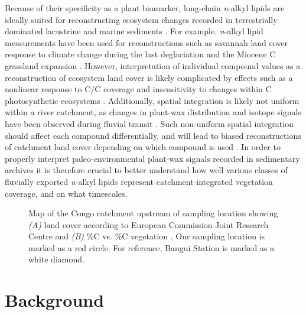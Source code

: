 Because of their specificity as a plant biomarker, long-chain \textit{n}-alkyl lipids are ideally suited for reconstructing ecosystem changes recorded in terrestrially dominated lacustrine and marine sediments \citep{Pancost:2004ij,Eglinton:2008hs,Castaneda:2011jb,Freeman:2014gi}. For example, \textit{n}-alkyl lipid  measurements have been used for reconstructions such as savannah land cover response to climate change during the last deglaciation \citep{Hughen:2004gc} and the Miocene C grassland expansion \citep{Freeman:2001tv,Hoetzel:2013hj}. However, interpretation of individual compound  values as a reconstruction of ecosystem land cover is likely complicated by effects such as a nonlinear response to C/C coverage \citep{Garcin:2014hg} and insensitivity to changes within C photosynthetic ecosystems \citep[\textit{i.e.} woody vs. non-woody][]{Feakins:2013ks,Magill:2013ab,Magill:2013cz}. Additionally, spatial integration is likely not uniform within a river catchment, as changes in plant-wax distribution and isotope signals have been observed during fluvial transit \citep{Galy:2011hk,Galy:2011ix,Ponton:2014jr}. Such non-uniform spatial integration should affect each compound differentially, and will lead to biased reconstructions of catchment land cover depending on which compound is used \citep[\textit{e.g.}][]{Wang:2013jz}. In order to properly interpret paleo-environmental plant-wax signals recorded in sedimentary archives it is therefore crucial to better understand how well various classes of fluvially exported \textit{n}-alkyl lipids represent catchment-integrated vegetation coverage, and on what timescales.

\begin{figure}[t]
	\caption[Congo catchment map showing land cover and \%C vs. \%C vegetation]{Map of the Congo catchment upstream of sampling location showing \textit{(A)} land cover according to European Commission Joint Research Centre \citep{Mayaux:2004uw} and \textit{(B)} \%C vs. \%C vegetation \citep{Still:2010wh}. Our sampling location is marked as a red circle. For reference, Bangui Station \citep{Coynel:2005cn,Bouillon:2012cw,Bouillon:2014ko} is marked as a white diamond.}
	\label{Ch4Fig:1} 
\end{figure}

\section{Background}

